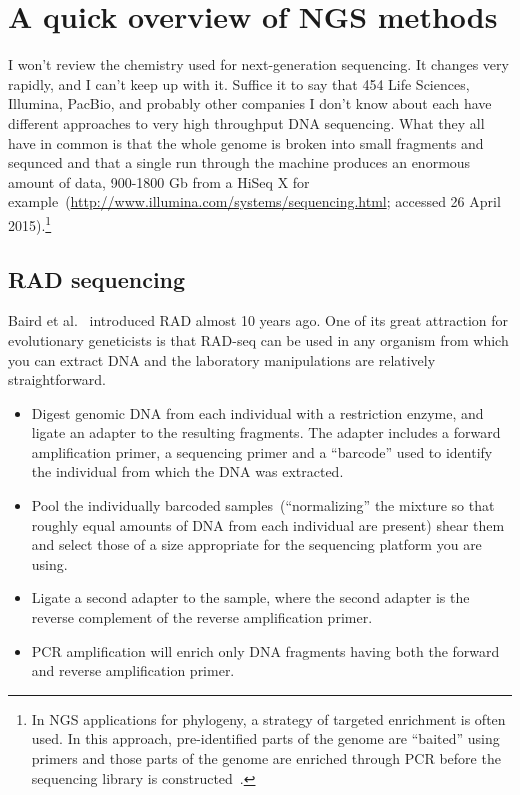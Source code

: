 \documentclass[12pt]{article}
\begin{document}
\section*{A quick overview of NGS methods}

I won't review the chemistry used for next-generation sequencing. It
changes very rapidly, and I can't keep up with it. Suffice it to say
that 454 Life Sciences, Illumina, PacBio, and probably other companies
I don't know about each have different approaches to very high
throughput DNA sequencing. What they all have in common is that the
whole genome is broken into small fragments and sequnced and that a
single run through the machine produces an enormous amount of data,
900-1800 Gb from a HiSeq X for
example~(\url{http://www.illumina.com/systems/sequencing.html};
accessed 26 April 2015).\footnote{In NGS applications for phylogeny, a
  strategy of targeted enrichment is often used. In this approach,
  pre-identified parts of the genome are ``baited'' using primers and
  those parts of the genome are enriched through PCR before the
  sequencing library is constructed~\cite{Lemmon-etal-2012}.} 

\subsection*{RAD sequencing}

Baird et al.~\cite{Baird-etal-2008} introduced RAD almost 10 years
ago. One of its great attraction for evolutionary geneticists is that
RAD-seq can be used in any organism from which you can extract DNA and
the laboratory manipulations are relatively straightforward.

\begin{itemize}

\item Digest genomic DNA from each individual with a restriction
  enzyme, and ligate an adapter to the resulting fragments. The
  adapter includes a forward amplification primer, a sequencing primer
  and a ``barcode'' used to identify the individual from which the DNA
  was extracted.

\item Pool the individually barcoded samples~(``normalizing'' the
  mixture so that roughly equal amounts of DNA from each individual
  are present) shear them and select those of a size appropriate for
  the sequencing platform you are using.

\item Ligate a second adapter to the sample, where the second adapter
  is the reverse complement of the reverse amplification primer. 

\item PCR amplification will enrich only DNA fragments having both the
  forward and reverse amplification primer.

\end{itemize}
\end{document}

